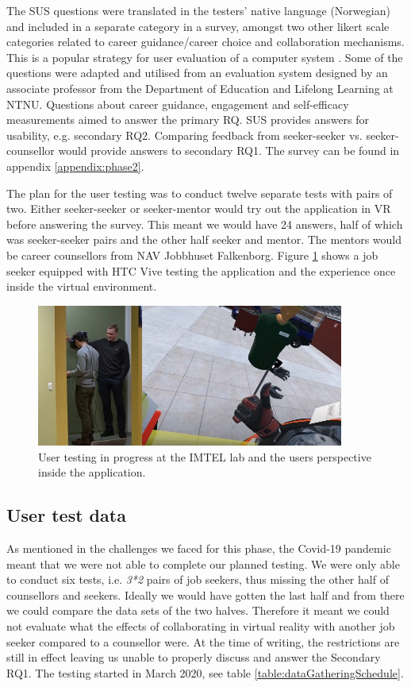 The SUS questions were translated in the testers' native language (Norwegian) and included in a separate category in a survey, amongst two other likert scale categories related to career guidance/career choice and collaboration mechanisms. This is a popular strategy for user evaluation of a computer system \cite{oates2005researching}. Some of the questions were adapted and utilised from an evaluation system designed by an associate professor from the Department of Education and Lifelong Learning at NTNU. Questions about career guidance, engagement and self-efficacy measurements aimed to answer the primary RQ. SUS provides answers for usability, e.g. secondary RQ2. Comparing feedback from seeker-seeker vs. seeker-counsellor would provide answers to secondary RQ1.  The survey can be found in appendix \ref{appendix:phase2}.

The plan for the user testing was to conduct twelve separate tests with pairs of two. Either seeker-seeker or seeker-mentor would try out the application in VR before answering the survey. This meant we would have 24 answers, half of which was seeker-seeker pairs and the other half seeker and mentor. The  mentors would be career counsellors from NAV Jobbhuset Falkenborg. Figure \ref{fig:tastingPhase2} shows a job seeker equipped with HTC Vive testing the application and the experience once inside the virtual environment. 


\begin{figure}[]
  \centering
   \captionsetup{width=.9\linewidth}
    \includegraphics[width=0.9\textwidth]{fig/phase_2/phase2_testing.jpg}
 \caption{User testing in progress at the IMTEL lab and the users perspective inside the application.}
\label{fig:tastingPhase2}
\end{figure}


\subsection{User test data}
As mentioned in the challenges we faced for this phase, the Covid-19 pandemic meant that we were not able to complete our planned testing. We were only able to conduct six tests, i.e. \textit{3*2} pairs of job seekers, thus missing the other half of counsellors and seekers. Ideally we would have gotten the last half and from there we could  compare the data sets of the two halves. Therefore it meant we could not evaluate what the effects of collaborating in virtual reality with another job seeker compared to a counsellor were. At the time of writing, the restrictions are still in effect leaving us unable to properly discuss and answer the Secondary RQ1. The testing started in March 2020, see table \ref{table:dataGatheringSchedule}.     


